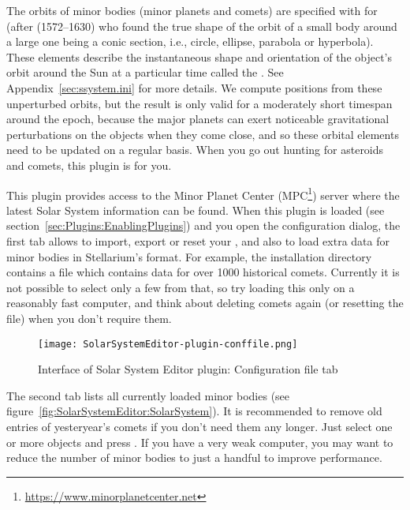 The orbits of minor bodies (minor planets and comets) are specified with  for 
 (after  (1572--1630) who found the true shape of the orbit 
of a small body around a large one being a conic section, i.e., circle, ellipse, parabola or hyperbola). These elements 
describe the instantaneous shape and orientation of the object's orbit around the Sun at a particular time 
called the .  See Appendix~\ref{sec:ssystem.ini} for more details. 
We compute positions from these unperturbed orbits, but the result is only valid for 
a moderately short timespan around the epoch, because the major planets can exert noticeable gravitational perturbations 
on the objects when they come close, and so these orbital elements need to be updated on a regular basis. 
When you go out hunting for asteroids and comets, this plugin is for you.

This plugin provides access to the Minor Planet Center (MPC\footnote{\url{https://www.minorplanetcenter.net}}) server where the latest Solar System information can be found. When this plugin is
loaded (see section~\ref{sec:Plugins:EnablingPlugins}) and you open the configuration dialog, the first tab allows to import, export or reset your , 
and also to load extra data for minor bodies in Stellarium's  format. 
For example, the installation directory contains a file  which contains 
data for over 1000 historical comets. Currently it is not possible to select only a few from that, 
so try loading this only on a reasonably fast computer, and think about deleting comets again (or resetting the file) when you don't require them.

\begin{figure}[tbh]\centering
	\texttt{[image: SolarSystemEditor-plugin-conffile.png]}
	\caption{Interface of Solar System Editor plugin: Configuration file tab}
	\label{fig:SolarSystemEditor:ConfigurationFile}
\end{figure}

The second tab lists all currently loaded minor bodies (see figure~\ref{fig:SolarSystemEditor:SolarSystem}).  It is recommended
to remove old entries of yesteryear's comets if you don't need them any
longer. Just select one or more objects and press .
If you have a very weak computer, you may want to reduce the number of
minor bodies to just a handful to improve performance.

